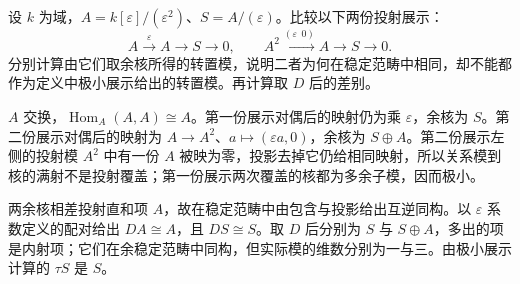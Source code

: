 \begin{optionalexercise}\label{b5:ex:10-nonminimal-transpose}
	设 \(k\) 为域，\(A=k[\varepsilon]/(\varepsilon^2)\)、\(S=A/(\varepsilon)\)。比较以下两份投射展示：
	\[
		A\xrightarrow{\varepsilon}A\longrightarrow S\longrightarrow0,
		\qquad
		A^2\xrightarrow{(\varepsilon\ \ 0)}A\longrightarrow S\longrightarrow0.
	\]
	分别计算由它们取余核所得的转置模，说明二者为何在稳定范畴中相同，却不能都作为定义中极小展示给出的转置模。再计算取 \(D\) 后的差别。
\end{optionalexercise}
\begin{solution}
	\(A\) 交换，\(\operatorname{Hom}_A(A,A)\cong A\)。第一份展示对偶后的映射仍为乘 \(\varepsilon\)，余核为 \(S\)。第二份展示对偶后的映射为 \(A\to A^2\)、\(a\mapsto(\varepsilon a,0)\)，余核为 \(S\oplus A\)。第二份展示左侧的投射模 \(A^2\) 中有一份 \(A\) 被映为零，投影去掉它仍给相同映射，所以关系模到核的满射不是投射覆盖；第一份展示两次覆盖的核都为多余子模，因而极小。

	两余核相差投射直和项 \(A\)，故在稳定范畴中由包含与投影给出互逆同构。以 \(\varepsilon\) 系数定义的配对给出 \(DA\cong A\)，且 \(DS\cong S\)。取 \(D\) 后分别为 \(S\) 与 \(S\oplus A\)，多出的项是内射项；它们在余稳定范畴中同构，但实际模的维数分别为一与三。由极小展示计算的 \(\tau S\) 是 \(S\)。
\end{solution}

